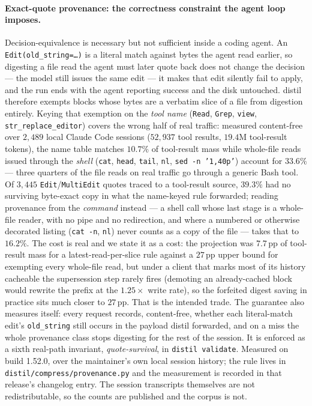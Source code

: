 \documentclass[11pt]{article}
\begin{document}
\paragraph{Exact-quote provenance: the correctness constraint the agent loop imposes.}
Decision-equivalence is necessary but not sufficient inside a coding agent. An
\texttt{Edit(old\_string=\ldots)} is a literal match against bytes the agent read earlier, so
digesting a file read the agent must later quote back does not change the decision --- the
model still issues the same edit --- it makes that edit silently fail to apply, and the run
ends with the agent reporting success and the disk untouched. distil therefore exempts blocks
whose bytes are a verbatim slice of a file from digestion entirely. Keying that exemption on the
\emph{tool name} (\texttt{Read}, \texttt{Grep}, \texttt{view}, \texttt{str\_replace\_editor})
covers the wrong half of real traffic: measured content-free over $2{,}489$ local Claude Code
sessions ($52{,}937$ tool results, $19.4$M tool-result tokens), the name table matches $10.7\%$
of tool-result mass while whole-file reads issued through the \emph{shell} (\texttt{cat},
\texttt{head}, \texttt{tail}, \texttt{nl}, \texttt{sed -n '1,40p'}) account for $\mathbf{33.6\%}$
--- three quarters of the file reads on real traffic go through a generic Bash tool. Of $3{,}445$
\texttt{Edit}/\texttt{MultiEdit} quotes traced to a tool-result source, $\mathbf{39.3\%}$ had no
surviving byte-exact copy in what the name-keyed rule forwarded; reading provenance from the
\emph{command} instead --- a shell call whose last stage is a whole-file reader, with no pipe and
no redirection, and where a numbered or otherwise decorated listing (\texttt{cat -n},
\texttt{nl}) never counts as a copy of the file --- takes that to $\mathbf{16.2\%}$. The cost is
real and we state it as a cost: the projection was $7.7$\,pp of tool-result mass for a
latest-read-per-slice rule against a $27$\,pp upper bound for exempting every whole-file read,
but under a client that marks most of its history cacheable the supersession step rarely fires
(demoting an already-cached block would rewrite the prefix at the $1.25\times$ write rate), so the
forfeited digest saving in practice sits much closer to $27$\,pp. That is the intended trade.
The guarantee also measures itself: every request records, content-free, whether each
literal-match edit's \texttt{old\_string} still occurs in the payload distil forwarded, and on a
miss the whole provenance class stops digesting for the rest of the session. It is enforced as a
sixth real-path invariant, \emph{quote-survival}, in \texttt{distil validate}. Measured on build 1.52.0, over the maintainer's own local
session history; the rule lives in \texttt{distil/compress/provenance.py} and the measurement is
recorded in that release's changelog entry. The session transcripts themselves are not
redistributable, so the counts are published and the corpus is not.
\end{document}
